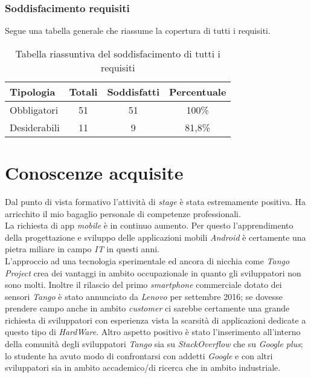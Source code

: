 \subsubsection{Soddisfacimento requisiti}
Segue una tabella generale che riassume la copertura di tutti i requisiti.
\begin{table}[H]
	\begin{center}
	  \begin{tabular}{ l  c  c  c }
	    \hline
	    \textbf{Tipologia} & \textbf{Totali} & \textbf{Soddisfatti} & \textbf{Percentuale} \\ \hline
	    Obbligatori & 51 & 51 & 100\%\\ \hline
	    Desiderabili & 11 & 9 & 81,8\%\\
	    \hline
	  \end{tabular}
	\end{center}
\caption{Tabella riassuntiva del soddisfacimento di tutti i requisiti}
\end{table}	
\section{Conoscenze acquisite}
Dal punto di vista formativo l'attività di \emph{stage} è stata estremamente positiva. Ha arricchito il mio bagaglio personale di competenze professionali.\\

La richiesta di app \emph{mobile} è in continuo aumento. Per questo l'apprendimento della progettazione e sviluppo delle applicazioni mobili \emph{Android} è certamente una pietra miliare in campo \emph{IT} in questi anni.\\

L'approccio ad una tecnologia sperimentale ed ancora di nicchia come \emph{Tango Project} crea dei vantaggi in ambito occupazionale in quanto gli sviluppatori non sono molti. Inoltre il rilascio del primo \emph{smartphone} commerciale dotato dei sensori \emph{Tango} è stato annunciato da \emph{Lenovo} per settembre 2016; se dovesse prendere campo anche in ambito \emph{customer} ci sarebbe certamente una grande richiesta di sviluppatori con esperienza vista la scarsità di applicazioni dedicate a questo tipo di \emph{HardWare}. Altro aspetto positivo è stato l'inserimento all'interno della comunità degli sviluppatori \emph{Tango} sia su \emph{StackOverflow} che su \emph{Google plus}; lo studente ha avuto modo di confrontarsi con addetti \emph{Google} e con altri sviluppatori sia in ambito accademico/di ricerca che in ambito industriale.\\

